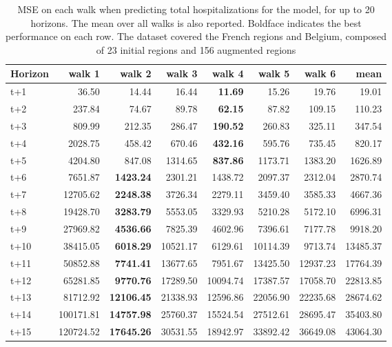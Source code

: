 \begin{table}[H]
\centering
\caption{MSE on each walk when predicting total hospitalizations for the model, for up to 20 horizons. The mean over all walks is also reported. Boldface indicates the best performance on each row. The dataset covered the French regions and Belgium, composed of 23 initial regions and 156 augmented regions }
\label{tab:MSE_walk_custom_linear_regression}
\begin{tabular}{lrrrrrrr}
\toprule
Horizon &    walk 1 &   walk 2 &   walk 3 &   walk 4 &   walk 5 &    walk 6 &     mean \\
\midrule
t+1  & 36.50  & 14.44  & 16.44  & \textbf{11.69}  & 15.26  & 19.76  & 19.01  \\
t+2  & 237.84  & 74.67  & 89.78  & \textbf{62.15}  & 87.82  & 109.15  & 110.23  \\
t+3  & 809.99  & 212.35  & 286.47  & \textbf{190.52}  & 260.83  & 325.11  & 347.54  \\
t+4  & 2028.75  & 458.42  & 670.46  & \textbf{432.16}  & 595.76  & 735.45  & 820.17  \\
t+5  & 4204.80  & 847.08  & 1314.65  & \textbf{837.86}  & 1173.71  & 1383.20  & 1626.89  \\
t+6  & 7651.87  & \textbf{1423.24}  & 2301.21  & 1438.72  & 2097.37  & 2312.04  & 2870.74  \\
t+7  & 12705.62  & \textbf{2248.38}  & 3726.34  & 2279.11  & 3459.40  & 3585.33  & 4667.36  \\
t+8  & 19428.70  & \textbf{3283.79}  & 5553.05  & 3329.93  & 5210.28  & 5172.10  & 6996.31  \\
t+9  & 27969.82  & \textbf{4536.66}  & 7825.39  & 4602.96  & 7396.61  & 7177.78  & 9918.20  \\
t+10  & 38415.05  & \textbf{6018.29}  & 10521.17  & 6129.61  & 10114.39  & 9713.74  & 13485.37  \\
t+11  & 50852.88  & \textbf{7741.41}  & 13677.65  & 7951.67  & 13425.50  & 12937.23  & 17764.39  \\
t+12  & 65281.85  & \textbf{9770.76}  & 17289.50  & 10094.74  & 17387.57  & 17058.70  & 22813.85  \\
t+13  & 81712.92  & \textbf{12106.45}  & 21338.93  & 12596.86  & 22056.90  & 22235.68  & 28674.62  \\
t+14  & 100171.81  & \textbf{14757.98}  & 25760.37  & 15524.54  & 27512.61  & 28695.47  & 35403.80  \\
t+15  & 120724.52  & \textbf{17645.26}  & 30531.55  & 18942.97  & 33892.42  & 36649.08  & 43064.30  \\

\end{tabular}
\end{table}
